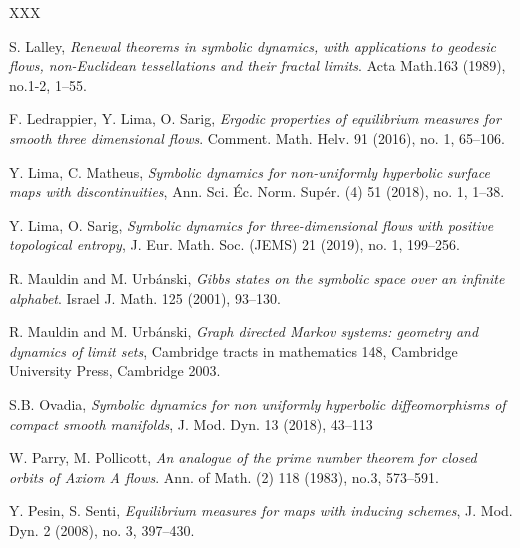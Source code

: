 \documentclass[letterpaper,11pt]{amsart}
\theoremstyle{plain}
\theoremstyle{plain}
\theoremstyle{definition}
\theoremstyle{remark}
\begin{document}
\begin{thebibliography}{XXX}


 S. Lalley, \emph{Renewal theorems in symbolic dynamics, with applications to geodesic flows, non-Euclidean tessellations and their fractal limits}. Acta Math.163 (1989), no.1-2, 1--55.


 F. Ledrappier, Y. Lima, O. Sarig, \emph{Ergodic properties of equilibrium measures for smooth three dimensional flows}. Comment. Math. Helv. 91 (2016), no. 1, 65--106.

 Y. Lima, C. Matheus, \emph{Symbolic dynamics for non-uniformly hyperbolic surface maps with discontinuities}, Ann. Sci. \'Ec. Norm. Sup\'er. (4) 51 (2018), no. 1, 1--38.

 Y. Lima, O. Sarig, \emph{Symbolic dynamics for three-dimensional flows with positive topological entropy}, J. Eur. Math. Soc. (JEMS) 21 (2019), no. 1, 199--256.

 R. Mauldin and M. Urb\'anski, \emph{Gibbs states on the symbolic space over an infinite alphabet}. Israel J. Math. 125 (2001), 93--130.

 R. Mauldin and M. Urb\'anski, \emph{Graph directed Markov systems: geometry and dynamics of limit sets}, Cambridge tracts in mathematics 148, Cambridge University Press, Cambridge 2003.

 S.B. Ovadia, \emph{Symbolic dynamics for non uniformly hyperbolic diffeomorphisms of compact smooth manifolds}, J. Mod. Dyn. 13 (2018), 43--113

 W. Parry, M. Pollicott,  \emph{An analogue of the prime number theorem for closed orbits of Axiom A flows}. Ann. of Math. (2) 118 (1983), no.3, 573--591.

 Y. Pesin, S. Senti, \emph{Equilibrium measures for maps with inducing schemes}, J. Mod. Dyn. 2
(2008), no. 3, 397--430.



\end{thebibliography}
\end{document}
